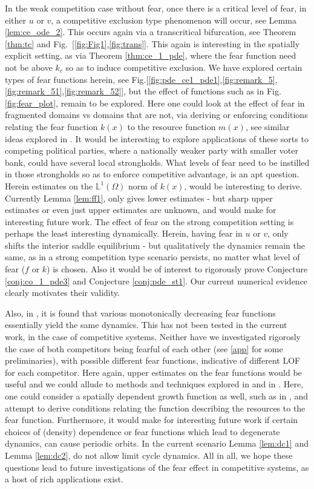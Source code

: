 \documentclass[10pt]{amsart}
\theoremstyle{definition}
\begin{document}
In the weak competition case without fear, once there is a critical level of fear, in either $u$ or $v$, a competitive exclusion type phenomenon will occur, see Lemma \ref{lem:ce_ode_2}. This occurs again via a transcritical bifurcation, see Theorem \ref{thm:tc} and Fig.~[\ref{fig:Fig1},\ref{fig:trans}]. This again is interesting in the spatially explicit setting, as via Theorem \ref{thm:ce_1_pde}, where the fear function need not be above $k_{c}$ so as to induce competitive exclusion. We have explored certain types of fear functions herein, see Fig.[\ref{fig:pde_ce1_pde1},\ref{fig:remark_5},\ref{fig:remark_51},\ref{fig:remark_52}], but the effect of functions such as in Fig. \ref{fig:fear_plot}, remain to be explored. Here one could look at the effect of fear in fragmented domains vs domains that are not, via deriving or enforcing conditions relating the fear function $k(x)$ to the resource function $m(x)$, see similar ideas explored in \cite{DeAngelis2016}. It would be interesting to explore applications of these sorts to competing political parties, where a nationally weaker party with smaller voter bank, could have several local strongholds. What levels of fear need to be instilled in those strongholds so as to enforce competitive advantage, is an apt question. Herein estimates on the $\mathbb{L}^{1}(\Omega)$ norm of $k(x)$, would be interesting to derive. Currently Lemma \ref{lem:ff1}, only gives lower estimates - but sharp upper estimates or even just upper estimates are unknown, and would make for interesting future work. The effect of fear on the strong competition setting is perhaps the least interesting dynamically. Herein, having fear in $u$ or $v$, only shifts the interior saddle equilibrium - but qualitatively the dynamics remain the same, as in a strong competition type scenario persists, no matter what level of fear ($f$ or $k$) is chosen. Also it would be of interest to rigorously prove Conjecture \ref{conj:co_1_pde3} and Conjecture \ref{conj:pde_st1}. Our current numerical evidence clearly motivates their validity.

Also, in \cite{Wang16}, it is found that various monotonically decreasing fear functions essentially yield the same dynamics. This has not been tested in the current work, in the case of competitive systems. Neither have we investigated rigorosly the case of both competitors being fearful of each other (see \ref{app} for some preliminaries), with possible different fear functions, indicative of different LOF for each competitor. Here again, upper estimates on the fear functions would be useful and we could allude to methods and techniques explored in \cite{Mazari2020a} and in \cite{Zhang20}. Here, one could consider a spatially dependent growth function as well, such as in \cite{Zhang20}, and attempt to derive conditions relating the function describing the resources to the fear function. Furthermore, it would make for interesting future work if certain choices of (density) dependence or fear functions which lead to degenerate dynamics, can cause periodic orbits. In the current scenario Lemma \ref{lem:dc1} and Lemma \ref{lem:dc2}, do not allow limit cycle dynamics. All in all, we hope these questions lead to future investigations of the fear effect in competitive systems, as a host of rich applications exist.  
	
\end{document}
